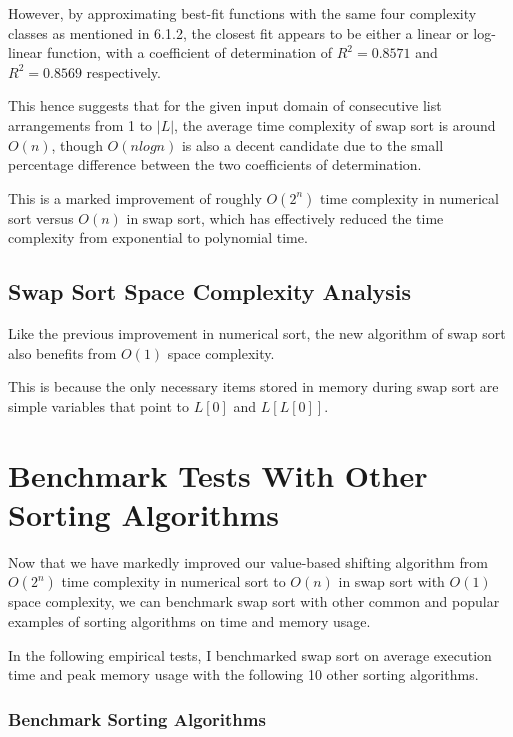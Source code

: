 \documentclass[12pt]{article}
\begin{document}
However, by approximating best-fit functions with the same four complexity classes as mentioned in 6.1.2, the closest fit appears to be either a linear or log-linear function, with a coefficient of determination of $R^2=0.8571$ and $R^2=0.8569$ respectively.

This hence suggests that for the given input domain of consecutive list arrangements from 1 to $|L|$, the average time complexity of swap sort is around $O(n)$, though $O(nlogn)$ is also a decent candidate due to the small percentage difference between the two coefficients of determination.

This is a marked improvement of roughly $O(2^n)$ time complexity in numerical sort versus $O(n)$ in swap sort, which has effectively reduced the time complexity from exponential to polynomial time.

\subsection{Swap Sort Space Complexity Analysis}
Like the previous improvement in numerical sort, the new algorithm of swap sort also benefits from $O(1)$ space complexity.

This is because the only necessary items stored in memory during swap sort are simple variables that point to $L[0]$ and $L[L[0]]$.

\section{Benchmark Tests With Other Sorting Algorithms}

Now that we have markedly improved our value-based shifting algorithm from $O(2^n)$ time complexity in numerical sort to $O(n)$ in swap sort with $O(1)$ space complexity, we can benchmark swap sort with other common and popular examples of sorting algorithms on time and memory usage.

In the following empirical tests, I benchmarked swap sort on average execution time and peak memory usage with the following 10 other sorting algorithms.

\subsubsection{Benchmark Sorting Algorithms}
\end{document}
